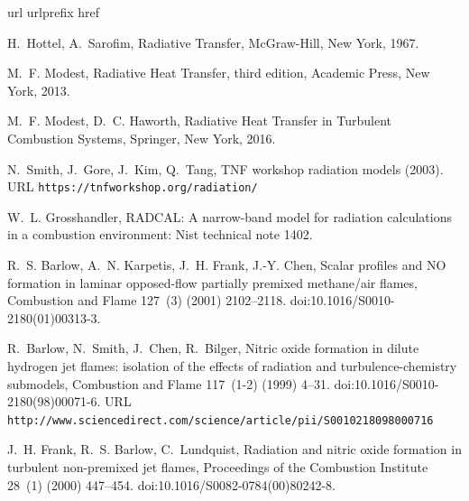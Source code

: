\documentclass[preprint,12pt]{elsarticle}
\begin{document}

 
% 

\begin{thebibliography}{10}
\expandafter\ifx\csname url\endcsname\relax
  \def\url#1{\texttt{#1}}\fi
\expandafter\ifx\csname urlprefix\endcsname\relax\def\urlprefix{URL }\fi
\expandafter\ifx\csname href\endcsname\relax
  \def\href#1#2{#2} \def\path#1{#1}\fi

H.~Hottel, A.~Sarofim, Radiative Transfer, {McGraw-Hill}, New York, 1967.

M.~F. Modest, Radiative Heat Transfer, third edition, {Academic Press},
  New York, 2013.
  
M.~F. Modest, D.~C. Haworth, Radiative Heat Transfer in Turbulent Combustion Systems, {Springer}, New York, 2016.

N.~Smith, J.~Gore, J.~Kim, Q.~Tang,
  \href{https://tnfworkshop.org/radiation/}{{TNF} workshop radiation models}
  (2003).
\newline\urlprefix\url{https://tnfworkshop.org/radiation/}

W.~L. Grosshandler, {RADCAL}: A narrow-band model for radiation calculations in
  a combustion environment: Nist technical note 1402.

R.~S. Barlow, A.~N. Karpetis, J.~H. Frank, J.-Y. Chen, Scalar profiles and {NO}
  formation in laminar opposed-flow partially premixed methane/air flames,
  Combustion and Flame 127~(3) (2001) 2102--2118.
\newblock \href {http://dx.doi.org/10.1016/S0010-2180(01)00313-3}
  {\path{doi:10.1016/S0010-2180(01)00313-3}}.

R.~Barlow, N.~Smith, J.~Chen, R.~Bilger,
  \href{http://www.sciencedirect.com/science/article/pii/S0010218098000716}{Nitric
  oxide formation in dilute hydrogen jet flames: isolation of the effects of
  radiation and turbulence-chemistry submodels}, Combustion and Flame 117~(1-2)
  (1999) 4--31.
\newblock \href {http://dx.doi.org/10.1016/S0010-2180(98)00071-6}
  {\path{doi:10.1016/S0010-2180(98)00071-6}}.
\newline\urlprefix\url{http://www.sciencedirect.com/science/article/pii/S0010218098000716}

J.~H. Frank, R.~S. Barlow, C.~Lundquist, Radiation and nitric oxide formation
  in turbulent non-premixed jet flames, Proceedings of the Combustion Institute
  28~(1) (2000) 447--454.
\newblock \href {http://dx.doi.org/10.1016/S0082-0784(00)80242-8}
  {\path{doi:10.1016/S0082-0784(00)80242-8}}.


\end{thebibliography}
\end{document}
